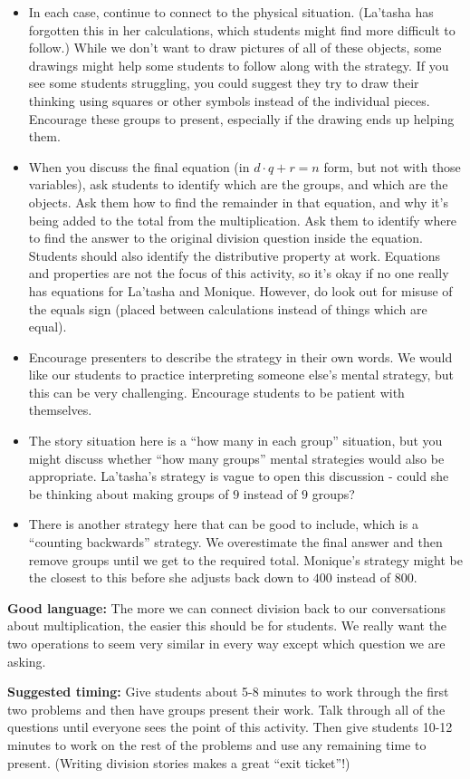 \documentclass[nooutcomes,noauthor, handout]{ximera}
\begin{document}
\begin{instructorNotes}
\begin{itemize}
	\item In each case, continue to connect to the physical situation. (La'tasha has forgotten this in her calculations, which students might find more difficult to follow.) While we don't want to draw pictures of all of these objects, some drawings might help some students to follow along with the strategy. If you see some students struggling, you could suggest they try to draw their thinking using squares or other symbols instead of the individual pieces. Encourage these groups to present, especially if the drawing ends up helping them.
	\item When you discuss the final equation (in $d \cdot q + r = n$ form, but not with those variables), ask students to identify which are the groups, and which are the objects. Ask them how to find the remainder in that equation, and why it's being added to the total from the multiplication. Ask them to identify where to find the answer to the original division question inside the equation. Students should also identify the distributive property at work. Equations and properties are not the focus of this activity, so it's okay if no one really has equations for La'tasha and Monique. However, do look out for misuse of the equals sign (placed between calculations instead of things which are equal).
	\item Encourage presenters to describe the strategy in their own words. We would like our students to practice interpreting someone else's mental strategy, but this can be very challenging. Encourage students to be patient with themselves.
	\item The story situation here is a ``how many in each group'' situation, but you might discuss whether ``how many groups'' mental strategies would also be appropriate. La'tasha's strategy is vague to open this discussion - could she be thinking about making groups of $9$ instead of $9$ groups?
	\item There is another strategy here that can be good to include, which is a ``counting backwards'' strategy. We overestimate the final answer and then remove groups until we get to the required total. Monique's strategy might be the closest to this before she adjusts back down to $400$ instead of $800$.
\end{itemize}


{\bf Good language:}  The more we can connect division back to our conversations about multiplication, the easier this should be for students. We really want the two operations to seem very similar in every way except which question we are asking. 


{\bf Suggested timing:} Give students about 5-8 minutes to work through the first two problems and then have groups present their work. Talk through all of the questions until everyone sees the point of this activity. Then give students 10-12 minutes to work on the rest of the problems and use any remaining time to present. (Writing division stories makes a great ``exit ticket''!)




\end{instructorNotes}
\end{document}
